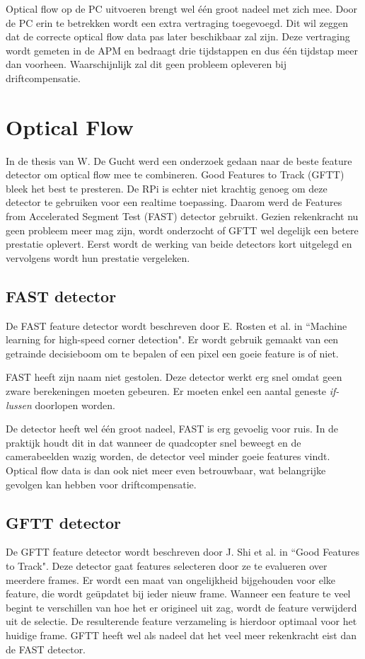 \npar Optical flow op de PC uitvoeren brengt wel \'e\'en groot nadeel met zich mee. Door de PC erin te betrekken wordt een extra vertraging toegevoegd. Dit wil zeggen dat de correcte optical flow data pas later beschikbaar zal zijn. Deze vertraging wordt gemeten in de APM en bedraagt drie tijdstappen en dus \'e\'en tijdstap meer dan voorheen. Waarschijnlijk zal dit geen probleem opleveren bij driftcompensatie.

\section{Optical Flow} \label{sec:OptFlowopt}
In de thesis van W. De Gucht werd een onderzoek gedaan naar de beste feature detector om optical flow mee te combineren. Good Features to Track (GFTT) \cite{paper:GFTT} bleek het best te presteren. De RPi is echter niet krachtig genoeg om deze detector te gebruiken voor een realtime toepassing. Daarom werd de Features from Accelerated Segment Test (FAST) \cite{paper:FAST} detector gebruikt. Gezien rekenkracht nu geen probleem meer mag zijn, wordt onderzocht of GFTT wel degelijk een betere prestatie oplevert. Eerst wordt de werking van beide detectors kort uitgelegd en vervolgens wordt hun prestatie vergeleken.

\subsection{FAST detector} \label{sec:FAST}
De FAST feature detector wordt beschreven door E. Rosten et al. in ``Machine learning for high-speed corner detection"\cite{paper:FAST}. Er wordt gebruik gemaakt van een getrainde decisieboom om te bepalen of een pixel een goeie feature is of niet.

\npar FAST heeft zijn naam niet gestolen. Deze detector werkt erg snel omdat geen zware berekeningen moeten gebeuren. Er moeten enkel een aantal geneste \textit{if-lussen} doorlopen worden.

\npar De detector heeft wel \'e\'en groot nadeel, FAST is erg gevoelig voor ruis. In de praktijk houdt dit in dat wanneer de quadcopter snel beweegt en de camerabeelden wazig worden, de detector veel minder goeie features vindt. Optical flow data is dan ook niet meer even betrouwbaar, wat belangrijke gevolgen kan hebben voor driftcompensatie.

\subsection{GFTT detector}
De GFTT feature detector wordt beschreven door J. Shi et al. in ``Good Features to Track"\cite{paper:GFTT}. Deze detector gaat features selecteren door ze te evalueren over meerdere frames. Er wordt een maat van ongelijkheid bijgehouden voor elke feature, die wordt ge\"updatet bij ieder nieuw frame. Wanneer een feature te veel begint te verschillen van hoe het er origineel uit zag, wordt de feature verwijderd uit de selectie. De resulterende feature verzameling is hierdoor optimaal voor het huidige frame. GFTT heeft wel als nadeel dat het veel meer rekenkracht eist dan de FAST detector.

